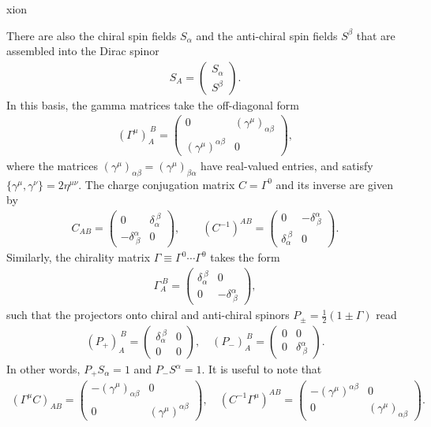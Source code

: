 xion\documentclass[12pt]{article}
\def\ie{\begin{equation}\begin{aligned}}
\def\fe{\end{aligned}\end{equation}}
\numberwithin{equation}{section}
\begin{document}
There are also the chiral spin fields $S_\alpha$ and the anti-chiral spin fields $S^\beta$ that are assembled into the Dirac spinor
\ie{}
S_A =
\begin{pmatrix}
	S_\alpha \\
	S^\beta
\end{pmatrix}.
\fe
In this basis, the gamma matrices take the off-diagonal form
\ie{}
(\Gamma^\mu)_A^{~B} =
\begin{pmatrix}
0 & (\gamma^\mu)_{\alpha\beta} \\
(\gamma^\mu)^{\alpha\beta} & 0
\end{pmatrix},
\fe
where the matrices $(\gamma^\mu)_{\alpha\beta} = (\gamma^\mu)_{\beta\alpha}$ have real-valued entries, and satisfy $\{\gamma^\mu, \gamma^\nu\} = 2\eta^{\mu\nu}$.  The charge conjugation matrix $C = \Gamma^0$ and its inverse are given by
\ie{}
C_{AB} =
\begin{pmatrix}
0 & \delta_\alpha^{~\beta} \\
- \delta^\alpha_{~\beta} & 0
\end{pmatrix}, \qquad
(C^{-1})^{AB} =
\begin{pmatrix}
0 & -\delta^\alpha_{~\beta} \\
\delta_\alpha^{~\beta} & 0
\end{pmatrix}.
\fe
Similarly, the chirality matrix $\Gamma \equiv \Gamma^0 \cdots \Gamma^9$ takes the form
\ie{}
\Gamma_A^{~B} =
\begin{pmatrix}
\delta_\alpha^{~\beta} & 0 \\
0 & -\delta^\alpha_{~\beta}
\end{pmatrix},
\fe
such that the projectors onto chiral and anti-chiral spinors $P_\pm = \frac12(1\pm \Gamma)$ read
\ie{}
(P_+)_A^{~B} =
\begin{pmatrix}
\delta_\alpha^{~\beta} & 0 \\
0 & 0
\end{pmatrix}, \quad
(P_-)_A^{~B} =
\begin{pmatrix}
0 & 0 \\
0 & \delta^\alpha_{~\beta}
\end{pmatrix}.
\fe
In other words, $P_+ S_\alpha = 1$ and $P_- S^\alpha = 1$. It is useful to note that
\ie{}
(\Gamma^\mu C)_{AB} =
\begin{pmatrix}
-(\gamma^\mu)_{\alpha\beta} & 0 \\
0 & (\gamma^\mu)^{\alpha\beta}
\end{pmatrix}, \quad
(C^{-1}\Gamma^\mu )^{AB} =
\begin{pmatrix}
-(\gamma^\mu)^{\alpha\beta} & 0 \\
0 & (\gamma^\mu)_{\alpha\beta}
\end{pmatrix}.
\fe
\end{document}
